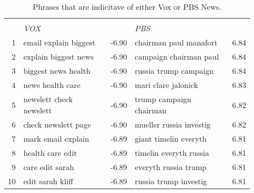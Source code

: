 \begin{table}[ht]
\caption{Phrases that are indicitave of either Vox or PBS News.}
\label{tab:vox_pbs}
\centering
\begin{tabular}{r||lr|lr}
  \hline \hline
  &             &        &          &        \\
 & \textit{VOX} &  & \textit{PBS} &  \\ 
  \hline
1 & email explain biggest & -6.90 & chairman paul manafort & 6.84 \\ 
  2 & explain biggest news & -6.90 & campaign chairman paul & 6.84 \\ 
  3 & biggest news health & -6.90 & russia trump campaign & 6.84 \\ 
  4 & news health care & -6.90 & mari clare jalonick & 6.83 \\ 
  5 & newslett check newslett & -6.90 & trump campaign chairman & 6.82 \\ 
  6 & check newslett page & -6.90 & mueller russia investig & 6.82 \\ 
  7 & mark email explain & -6.89 & giant timelin everyth & 6.81 \\ 
  8 & health care edit & -6.89 & timelin everyth russia & 6.81 \\ 
  9 & care edit sarah & -6.89 & everyth russia trump & 6.81 \\ 
  10 & edit sarah kliff & -6.89 & russia trump investig & 6.81 \\ 
   \hline
\end{tabular}
\end{table}
